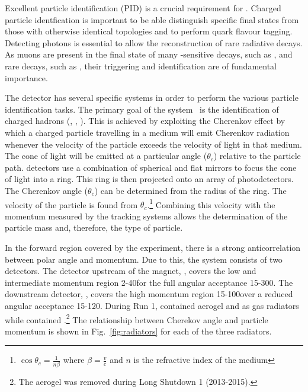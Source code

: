 Excellent particle identification (PID) is a crucial requirement for \lhcb. Charged particle identfication is important to be able distinguish specific final states from those with otherwise identical topologies and to perform \bquark quark flavour tagging. Detecting photons is essential to allow the reconstruction of rare radiative decays. As muons are present in the final state of many \CP-sensitive decays, such as \BsToJPsiPhi, and rare decays, such as \BsToMuMu, their triggering and identification are of fundamental importance.

The \lhcb detector has several specific systems in order to perform the various particle identification tasks. The primary goal of the \rich system~\cite{LHCb-TDR-009,LHCb-DP-2012-003} is the identification of charged hadrons (\pion, \kaon, \proton). This is achieved by exploiting the Cherenkov effect by which a charged particle travelling in a medium will emit Cherenkov radiation whenever the velocity of the particle exceeds the velocity of light in that medium. The cone of light will be emitted at a particular angle ($\theta_{c}$) relative to the particle path. \rich detectors use a combination of spherical and flat mirrors to focus the cone of light into a ring. This ring is then projected onto an array of photodetectors. The Cherenkov angle ($\theta_{c}$) can be determined from the radius of the ring. The velocity of the particle is found from $\theta_{c}$.\footnote{$\cos\theta_{c} = \frac{1}{n\beta}$ where $\beta = \frac{v}{c}$ and $n$ is the refractive index of the medium} Combining this velocity with the momentum measured by the tracking systems allows the determination of the particle mass and, therefore, the type of particle. 

In the forward region covered by the \lhcb experiment, there is a strong anticorrelation between polar angle and momentum. Due to this, the \rich system consists of two detectors. The detector upstream of the magnet, \richone, covers the low and intermediate momentum region 2-40\gevc for the full angular acceptance 15-300\mrad. The downstream detector, \richtwo, covers the high momentum region 15-100\gevc over a reduced angular acceptance 15-120\mrad. During Run 1, \richone contained aerogel and \cfourften as gas radiators while \richtwo contained \cffour.\footnote{The aerogel was removed during Long Shutdown 1 (2013-2015).} The relationship between Cherekov angle and particle momentum is shown in Fig.~\ref{fig:radiators} for each of the three radiators.

